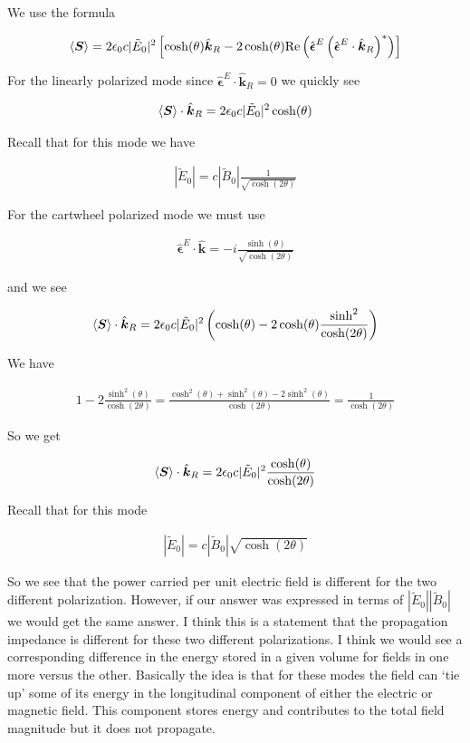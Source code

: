 \documentclass[12pt]{article}
\newcommand{\ep}{\epsilon}
\renewcommand{\vec}[1]{\boldsymbol{#1}}
\newcommand{\unitvec}[1]{\hat{\boldsymbol{#1}}}
\begin{document}
We use the formula

\begin{align}
\Braket{\vec{S}} = 2\ep_0 c|\tilde{E}_0|^2 \left[\cosh(\theta)\unitvec{k}_R - 2\cosh(\theta)\text{Re}\left(\unitvec{\ep}^E\left(\unitvec{\ep}^E\cdot\unitvec{k}_R\right)^*\right)\right]
\end{align}

For the linearly polarized mode since $\unitvec{\ep}^E\cdot\unitvec{k}_R =0 $ we quickly see

\begin{align}
\Braket{\vec{S}}\cdot\unitvec{k}_R = 2\ep_0c|\tilde{E}_0|^2 \cosh(\theta)
\end{align}

Recall that for this mode we have

\begin{align}
|\tilde{E}_0| = c|\tilde{B}_0|\frac{1}{\sqrt{\cosh(2\theta)}}
\end{align}

For the cartwheel polarized mode we must use

\begin{align}
\unitvec{\ep}^E\cdot\unitvec{k} = -i\frac{\sinh(\theta)}{\sqrt{\cosh(2\theta)}}
\end{align}

and we see

\begin{align}
\Braket{\vec{S}}\cdot\unitvec{k}_R = 2\ep_0c|\tilde{E}_0|^2 \left(\cosh(\theta) - 2\cosh(\theta)\frac{\sinh^2}{\cosh(2\theta)}\right)
\end{align}

We have

\begin{align}
1-2\frac{\sinh^2(\theta)}{\cosh(2\theta)} = \frac{\cosh^2(\theta)+\sinh^2(\theta)-2\sinh^2(\theta)}{\cosh(2\theta)} = \frac{1}{\cosh(2\theta)}
\end{align}

So we get

\begin{align}
\Braket{\vec{S}}\cdot\unitvec{k}_R = 2\ep_0c|\tilde{E}_0|^2 \frac{\cosh(\theta)}{\cosh(2\theta)}
\end{align}

Recall that for this mode

\begin{align}
|\tilde{E}_0| = c|\tilde{B}_0| \sqrt{\cosh(2\theta)}
\end{align}

So we see that the power carried per unit electric field is different for the two different polarization.
However, if our answer was expressed in terms of $|\tilde{E}_0||\tilde{B}_0|$ we would get the same answer.
I think this is a statement that the propagation impedance is different for these two different polarizations.
I think we would see a corresponding difference in the energy stored in a given volume for fields in one more versus the other.
Basically the idea is that for these modes the field can `tie up' some of its energy in the longitudinal component of either the electric or magnetic field.
This component stores energy and contributes to the total field magnitude but it does not propagate.
\end{document}
